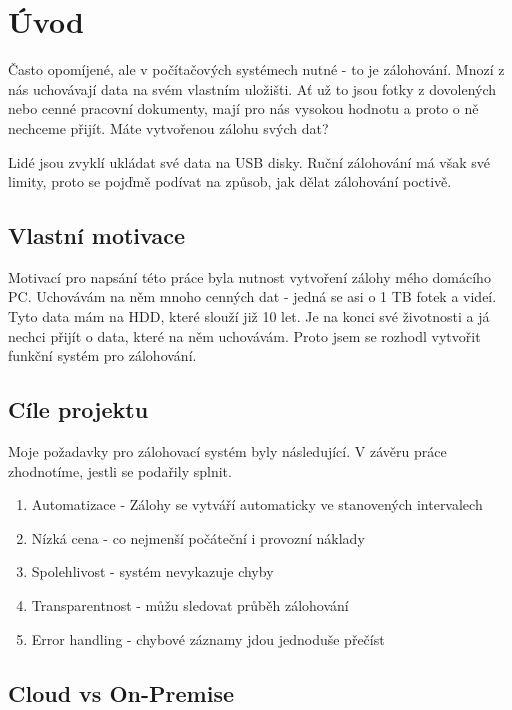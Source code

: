 \documentclass[a4paper,12pt, oneside]{book}
\begin{document}
\clearpage
\pagestyle{fancy}

\chapter{Úvod}

Často opomíjené, ale v počítačových systémech nutné - to je zálohování.
Mnozí z nás uchovávají data na svém vlastním uložišti. Ať už to jsou
fotky z dovolených nebo cenné pracovní dokumenty, mají pro nás vysokou hodnotu
a proto o ně nechceme přijít. Máte vytvořenou zálohu svých dat? 

Lidé jsou zvyklí ukládat své data na USB disky. Ruční zálohování má však své limity,
proto se pojďmě podívat na způsob, jak dělat zálohování poctivě.


\section{Vlastní motivace}

Motivací pro napsání této práce byla nutnost vytvoření zálohy mého
domácího PC. Uchovávám na něm mnoho cenných dat -
jedná se asi o 1 TB fotek a videí. Tyto data mám na HDD, které
slouží již 10 let. Je na konci své životnosti a já nechci přijít o data,
které na něm uchovávám. Proto jsem se rozhodl vytvořit funkční systém 
pro zálohování.

\section{Cíle projektu}

Moje požadavky pro zálohovací systém byly následující. V závěru práce zhodnotíme, 
jestli se podařily splnit.

\begin{enumerate}
	\item Automatizace - Zálohy se vytváří automaticky ve stanovených intervalech
	\item Nízká cena - co nejmenší počáteční i provozní náklady
	\item Spolehlivost - systém nevykazuje chyby
	\item Transparentnost - můžu sledovat průběh zálohování
	\item Error handling - chybové záznamy jdou jednoduše přečíst
\end{enumerate}

\section{Cloud vs On-Premise}
\end{document}
